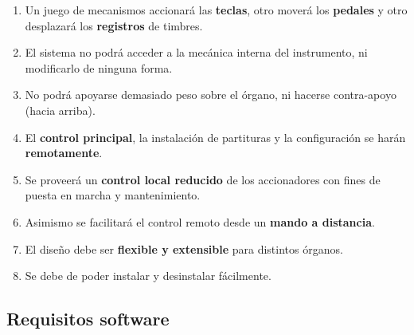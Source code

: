 \documentclass[10pt,a4paper]{article}
\begin{document}
	\begin{enumerate}
	
		\item Un juego de mecanismos accionará las \textbf{teclas}, otro moverá
		los \textbf{pedales} y otro desplazará los \textbf{registros} de
		timbres.
		
		\item El sistema no podrá acceder a la mecánica interna del instrumento,
		ni modificarlo de ninguna forma.
		
		\item No podrá apoyarse demasiado peso sobre el órgano, ni hacerse
		contra-apoyo (hacia arriba).
		
		\item El \textbf{control principal}, la instalación de partituras y la
		configuración se harán \textbf{remotamente}.
		
		\item Se proveerá un \textbf{control local reducido} de los accionadores
		con fines de puesta en marcha y mantenimiento.
		
		\item Asimismo se facilitará el control remoto desde un \textbf{mando a
		distancia}.
		
		\item El diseño debe ser \textbf{flexible y extensible} para distintos
		órganos.
		
		\item Se debe de poder instalar y desinstalar fácilmente.
		
	\end{enumerate}
	
	\subsection{Requisitos software}
	
\end{document}
